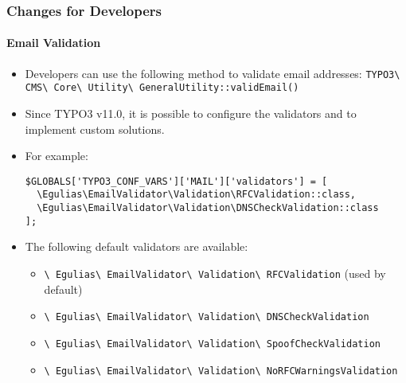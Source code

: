 %

\begin{frame}[fragile]
	\frametitle{Changes for Developers}
	\framesubtitle{Email Validation}

	\lstset{basicstyle=\tiny\ttfamily}

	\begin{itemize}
		\item Developers can use the following method to validate email addresses:
			\newline\smaller
				\texttt{TYPO3\textbackslash
					CMS\textbackslash
					Core\textbackslash
					Utility\textbackslash
					GeneralUtility::validEmail()}\normalsize

		\item Since TYPO3 v11.0, it is possible to configure the validators
			and to implement custom solutions.

		\item For example:
\begin{lstlisting}
$GLOBALS['TYPO3_CONF_VARS']['MAIL']['validators'] = [
  \Egulias\EmailValidator\Validation\RFCValidation::class,
  \Egulias\EmailValidator\Validation\DNSCheckValidation::class
];
\end{lstlisting}

		\item The following default validators are available:
			\begin{itemize}\smaller
				\item \texttt{\textbackslash
					Egulias\textbackslash
					EmailValidator\textbackslash
					Validation\textbackslash
					RFCValidation} (used by default)
				\item \texttt{\textbackslash
					Egulias\textbackslash
					EmailValidator\textbackslash
					Validation\textbackslash
					DNSCheckValidation}
				\item \texttt{\textbackslash
					Egulias\textbackslash
					EmailValidator\textbackslash
					Validation\textbackslash
					SpoofCheckValidation}
				\item \texttt{\textbackslash
					Egulias\textbackslash
					EmailValidator\textbackslash
					Validation\textbackslash
					NoRFCWarningsValidation}
			\end{itemize}
	\end{itemize}

\end{frame}

